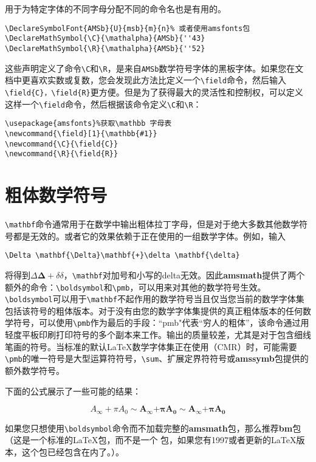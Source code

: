 \documentclass[openany]{ctexbook}
\begin{document}
用于为特定字体的不同字母分配不同的命令名也是有用的。
\begin{verbatim}
\DeclareSymbolFont{AMSb}{U}{msb}{m}{n}% 或者使用amsfonts包
\DeclareMathSymbol{\C}{\mathalpha}{AMSb}{''43}
\DeclareMathSymbol{\R}{\mathalpha}{AMSb}{''52}
\end{verbatim}

这些声明定义了命令\verb|\C|和\verb|\R|，是来自\verb|AMSb|数学符号字体的黑板字体。如果您在文档中更喜欢实数或复数，您会发现此方法比定义一个\verb|\field|命令，然后输入\verb|\field{C}，\field{R}|更方便。但是为了获得最大的灵活性和控制权，可以定义这样一个\verb|\field|命令，然后根据该命令定义\verb|\C|和\verb|\R|：
\begin{verbatim}
\usepackage{amsfonts}%获取\mathbb 字母表
\newcommand{\field}[1}{\mathbb{#1}}
\newcommand{\C}{\field{C}}
\newcommand{\R}{\field{R}}
\end{verbatim}
\section{粗体数学符号}
\verb|\mathbf|命令通常用于在数学中输出粗体拉丁字母，但是对于绝大多数其他数学符号都是无效的。或者它的效果依赖于正在使用的一组数学字体。例如，输入
\begin{verbatim}
\Delta \mathbf{\Delta}\mathbf{+}\delta \mathbf{\delta}
\end{verbatim}
将得到$\Delta \boldsymbol{\Delta}+\delta\delta$，\verb|\mathbf|对加号和小写的delta无效。因此{\bfseries amsmath}提供了两个额外的命令：\verb|\boldsymbol|和\verb|\pmb|，可以用来对其他的数学符号生效。\verb|\boldsymbol|可以用于\verb|\mathbf|不起作用的数学符号当且仅当您当前的数学字体集包括该符号的粗体版本。对于没有由您的数学字体集提供的真正粗体版本的任何数学符号，可以使用\verb|\pmb|作为最后的手段：``pmb"代表“穷人的粗体”，该命令通过用轻度平板印刷打印符号的多个副本来工作。输出的质量较差，尤其是对于包含细线笔画的符号。当标准的默认\LaTeX 数学字体集正在使用（CMR）时，可能需要\verb|\pmb|的唯一符号是大型运算符符号，\verb|\sum|、扩展定界符符号或{\bfseries amssymb}包\cite{8}提供的额外数学符号。

下面的公式展示了一些可能的结果：
\begin{tcblisting}{}
\[
A_\infty+ \pi A_0
\sim \mathbf{A}_{\boldsymbol{\infty}} \boldsymbol{+}
  \boldsymbol{\pi} \mathbf{A}_{\boldsymbol{0}}
\sim\pmb{A}_{\pmb{\infty}} \pmb{+}\pmb{\pi} \pmb{A}_{\pmb{0}}
\]
\end{tcblisting}

如果您只想使用\verb|\boldsymbol|命令而不加载完整的{\bfseries amsmath}包，那么推荐{\bfseries bm}包（这是一个标准的\LaTeX 包，而不是一个  包，如果您有1997或者更新的\LaTeX 版本，这个包已经包含在内了。）。
\end{document}

